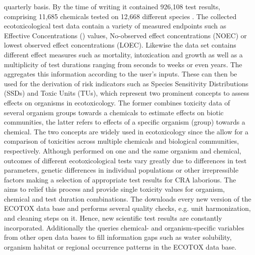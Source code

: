quarterly basis. By the time of writing it contained 926,108 test results, comprising 11,685 chemicals tested on 12,668 different species \citep{elonen_ecotoxicology_2018}. The collected ecotoxicological test data contain a variety of measured endpoints such as Effective Concentrations (\ecfifty{}) values, No-observed effect concentrations (NOEC) or lowest observed effect concentrations (LOEC). Likewise the data set contains different effect measures such as mortality, intoxication and growth as well as a multiplicity of test durations ranging from seconds to weeks or even years. The \etoxbase{} aggregates this information according to the user's inputs. These can then be used for the derivation of risk indicators such as Species Sensitivity Distributions (SSDs) \citep{posthuma_species_2002} and Toxic Units (TUs), which represent two prominent concepts to assess effects on organisms in ecotoxicology. The former combines toxicity data of several organism groups towards a chemicals to estimate effects on biotic communities, the latter refers to effects of a specific organism (group) towards a chemical. The two concepts are widely used in ecotoxicology \citep{kefford_definition_2011, schafer_effects_2011} since the allow for a comparison of toxicities across multiple chemicals and biological communities, respectively. Although performed on one and the same organism and chemical, outcomes of different ecotoxicological tests vary greatly due to differences in test parameters, genetic differences in individual populations or other irrepressible factors making a selection of appropriate test results for CRA laborious. The \etoxbase{} aims to relief this process and provide single toxicity values for organism, chemical and test duration combinations. The \etoxbase{} downloads every new version of the ECOTOX data base and performs several quality checks, e.g. unit harmonization, and cleaning steps on it. Hence, new scientific test results are constantly incorporated. Additionally the \etoxbase{} queries chemical- and organism-specific variables from other open data bases to fill information gaps such as water solubility, organism habitat or regional occurrence patterns in the ECOTOX data base.

\fi

